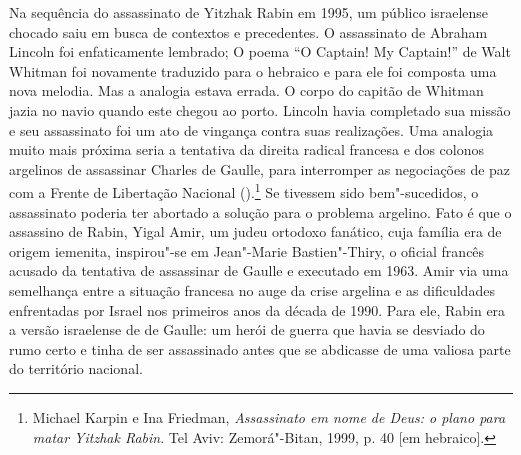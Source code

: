 Na sequência do assassinato de Yitzhak Rabin em 1995, um público
israelense chocado saiu em busca de contextos e precedentes. O
assassinato de Abraham Lincoln foi enfaticamente lembrado; O poema ``O
Captain! My Captain!'' de Walt Whitman foi novamente traduzido para o
hebraico e para ele foi composta uma nova melodia. Mas a analogia estava
errada. O corpo do capitão de Whitman jazia no navio quando este chegou
ao porto. Lincoln havia completado sua missão e seu assassinato foi um
ato de vingança contra suas realizações. Uma analogia muito mais próxima
seria a tentativa da direita radical francesa e dos colonos argelinos de
assassinar Charles de Gaulle, para interromper as negociações de paz com
a Frente de Libertação Nacional ().\footnote{Michael Karpin e Ina Friedman, \emph{Assassinato em nome de Deus: o plano para matar
Yitzhak Rabin}. Tel Aviv: Zemorá"-Bitan, 1999, p. 40 {[}em hebraico{]}.} Se tivessem sido bem"-sucedidos,
o assassinato poderia ter abortado a solução para o problema
argelino. Fato é que o assassino de Rabin, Yigal Amir, um judeu ortodoxo
fanático, cuja família era de origem iemenita, inspirou"-se em Jean"-Marie
Bastien"-Thiry, o oficial francês acusado da tentativa de assassinar de Gaulle e executado em 1963. 
Amir via uma semelhança entre a situação
francesa no auge da crise argelina e as dificuldades enfrentadas por
Israel nos primeiros anos da década de 1990. Para ele, Rabin era a
versão israelense de de Gaulle: um herói de guerra que havia se desviado
do rumo certo e tinha de ser assassinado antes que se abdicasse de uma
valiosa parte do território nacional.


